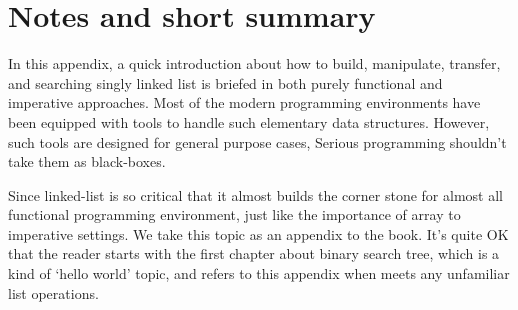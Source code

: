 \documentclass{article}
\begin{document}
\section{Notes and short summary}
In this appendix, a quick introduction about how to build, manipulate, transfer, and searching singly
linked list is briefed in both purely functional and imperative approaches. Most of the modern programming
environments have been equipped with tools to handle such elementary data structures. However, such tools
are designed for general purpose cases, Serious programming shouldn't take them as black-boxes.

Since linked-list is so critical that it almost builds the corner stone for almost all functional programming
environment, just like the importance of array to imperative settings. We take this topic as an appendix
to the book. It's quite OK that the reader starts with the first chapter about binary search tree, which
is a kind of `hello world' topic, and refers to this appendix when meets any unfamiliar list operations.

\end{document}
